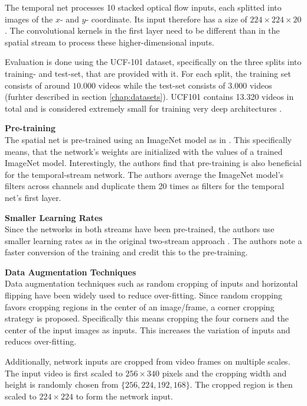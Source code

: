 The temporal net processes 10 stacked optical flow inputs, each splitted into images of the $x$- and $y$- coordinate.
Its input therefore has a size of $224 \times 224 \times 20$.
The convolutional kernels in the first layer need to be different than in the spatial stream to process these higher-dimensional inputs.

Evaluation is done using the UCF-101 dataset, specifically on the three splits into training- and test-set, that are provided with it.
For each split, the training set consists of around $10.000$ videos while the test-set consists of $3.000$ videos (furhter described in section \ref{chap:datasets}).
UCF101 contains 13.320 videos in total and is considered extremely small for training very deep architectures \cite{wang_towards_2015}.

\textbf{Pre-training}\\
The spatial net is pre-trained using an ImageNet model as in \cite{simonyan_two-stream_2014}.
This specifically means, that the network's weights are initialized with the values of a trained ImageNet model.
Interestingly, the authors find that pre-training is also beneficial for the temporal-stream network.
The authors average the ImageNet model's filters across channels and duplicate them 20 times as filters for the temporal net's first layer.

\textbf{Smaller Learning Rates}\\
Since the networks in both streams have been pre-trained, the authors use smaller learning rates as in the original two-stream approach \cite{simonyan_two-stream_2014}.
The authors note a faster conversion of the training and credit this to the pre-training.

\textbf{Data Augmentation Techniques}\\
Data augmentation techniques such as random cropping of inputs and horizontal flipping have been widely used to reduce over-fitting.
Since random cropping favors cropping regions in the center of an image/frame, a corner cropping strategy is proposed.
Specifically this means cropping the four corners and the center of the input images as inputs.
This increases the variation of inputs and reduces over-fitting.

Additionally, network inputs are cropped from video frames on multiple scales.
The input video is first scaled to $256 \times 340$ pixels and the cropping width and height is randomly chosen from $\{256, 224, 192, 168\}$.
The cropped region is then scaled to $224 \times 224$ to form the network input.

